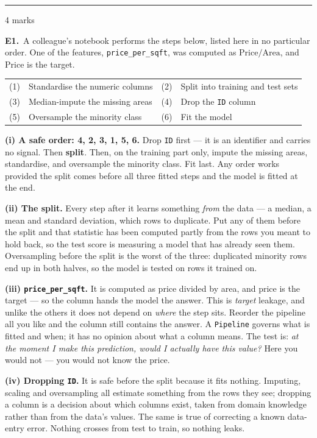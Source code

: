 \documentclass[10pt,a4paper]{article}
\newcommand{\parthead}[2]{\vspace{2pt}\noindent\rule{\linewidth}{0.4pt}\par\vspace{2pt}%
  \noindent{\bfseries Part #1}\hfill{\small #2}\par\vspace{1pt}}
\begin{document}
\newpage

\parthead{E --- Reasoning}{4 marks}

\textbf{E1.}\ A colleague's notebook performs the steps below, listed here in no particular order. One of the
features, \texttt{price\_per\_sqft}, was computed as $\text{Price}/\text{Area}$, and $\text{Price}$ is the
target.

\vspace{2mm}
\begin{center}\small
\begin{tabular}{@{}ll@{\qquad}ll@{}}
\hline
\rule{0pt}{10pt}(1) & Standardise the numeric columns & (2) & Split into training and test sets\\
(3) & Median-impute the missing areas & (4) & Drop the \texttt{ID} column\\
(5) & Oversample the minority class & (6) & Fit the model\\[1pt]
\hline
\end{tabular}
\end{center}

\vspace{4pt}

\textbf{(i) A safe order: 4, 2, 3, 1, 5, 6.} Drop \texttt{ID} first --- it is an identifier and carries no signal. Then \textbf{split}. Then, on the training part only, impute the missing areas, standardise, and oversample the minority class. Fit last. Any order works provided the split comes before all three fitted steps and the model is fitted at the end.\par\vspace{1mm}\textbf{(ii) The split.} Every step after it learns something \emph{from} the data --- a median, a mean and standard deviation, which rows to duplicate. Put any of them before the split and that statistic has been computed partly from the rows you meant to hold back, so the test score is measuring a model that has already seen them. Oversampling before the split is the worst of the three: duplicated minority rows end up in both halves, so the model is tested on rows it trained on.\par\vspace{1mm}\textbf{(iii) \texttt{price\_per\_sqft}.} It is computed as price divided by area, and price is the target --- so the column hands the model the answer. This is \emph{target} leakage, and unlike the others it does not depend on \emph{where} the step sits. Reorder the pipeline all you like and the column still contains the answer. A \texttt{Pipeline} governs what is fitted and when; it has no opinion about what a column means. The test is: \emph{at the moment I make this prediction, would I actually have this value?} Here you would not --- you would not know the price.\par\vspace{1mm}\textbf{(iv) Dropping \texttt{ID}.} It is safe before the split because it fits nothing. Imputing, scaling and oversampling all estimate something from the rows they see; dropping a column is a decision about which columns exist, taken from domain knowledge rather than from the data's values. The same is true of correcting a known data-entry error. Nothing crosses from test to train, so nothing leaks.
\end{document}
